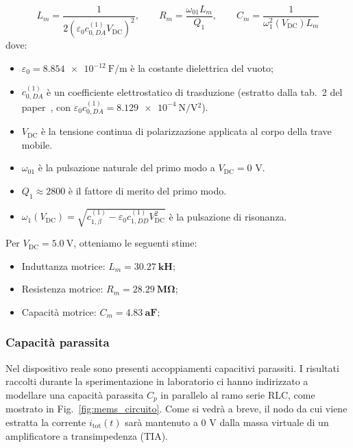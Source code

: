 \documentclass[11pt,a4paper]{article}
\begin{document}
\begin{equation}
    L_m = \frac{1}{2\left(\varepsilon_0 c_{0,DA}^{(1)} V_{\text{DC}}\right)^2}, \qquad
    R_m = \frac{\omega_{01} L_m}{Q_1}, \qquad
    C_m = \frac{1}{\omega_1^2(V_{\text{DC}}) L_m}
\end{equation}
dove:
\begin{itemize}
    \item $\varepsilon_0 = \SI{8.854e-12}{\farad/\meter}$ è la costante dielettrica del vuoto;
    \item $c_{0,DA}^{(1)}$ è un coefficiente elettrostatico di trasduzione (estratto dalla tab.~2 del paper~\cite{frangi2023}, con $\varepsilon_0 c_{0,DA}^{(1)} = \SI{8.129e-4}{\newton/\volt^2}$).
    \item $V_{\text{DC}}$ è la tensione continua di polarizzazione applicata al corpo della trave mobile.
    \item $\omega_{01}$ è la pulsazione naturale del primo modo a $V_{\text{DC}} = 0\text{ V}$.
    \item $Q_1 \approx 2800$ è il fattore di merito del primo modo.
    \item $\omega_1(V_{\text{DC}}) = \sqrt{c_{1,\beta}^{(1)} - \varepsilon_0 c_{1,DD}^{(1)} V_{\text{DC}}^2}$ è la pulsazione di risonanza.
\end{itemize}
Per $V_{\text{DC}} = \SI{5.0}{\volt}$, otteniamo le seguenti stime:
\begin{itemize}
    \item Induttanza motrice: $L_m = \mathbf{\SI{30.27}{\kilo\henry}}$;
    \item Resistenza motrice: $R_m = \mathbf{\SI{28.29}{\mega\ohm}}$;
    \item Capacità motrice: $C_m = \mathbf{\SI{4.83}{\atto\farad}}$;
\end{itemize}
\subsubsection{Capacità parassita}
Nel dispositivo reale sono presenti accoppiamenti capacitivi parassiti. I risultati raccolti durante la sperimentazione in laboratorio ci hanno indirizzato a modellare una capacità parassita $C_p$ in parallelo al ramo serie RLC, come mostrato in Fig.~\ref{fig:mems_circuito}. Come si vedrà a breve, il nodo da cui viene estratta la corrente $i_{\text{tot}}(t)$ sarà mantenuto a $0\text{ V}$ dalla massa virtuale di un amplificatore a transimpedenza (TIA).
\end{document}
